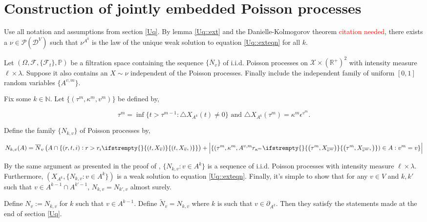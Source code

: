 \documentclass[12pt]{article}
\newcommand{\mb}{\mathbb}
\newcommand{\mc}{\mathcal}
\newcommand{\ov}{\overline}
\newcommand{\te}{\text}
\newcommand{\ep}{\epsilon}
\newcommand{\tr}{\textcolor{red}}
\newcommand{\ind}{\hspace{24pt}}
\newcommand{\pr}{\mb{P}}							%
\newcommand{\defeq}{:=}								%
\newcommand{\pmsr}{\mc{P}}							%
\newcommand{\cad}{\mc{D}}							%
\newcommand{\sta}{\mc{X}}							%
\newcommand{\cl}[1]{\ov{#1}}						%
\newcommand{\bdry}[1]{\partial_{#1}}				%
\newcommand{\indx}[1]{^{#1}}						%
\newcommand{\Xf}{X}									%
\newcommand{\poiss}{N}								%
\newcommand{\leb}{\lambda}							%
\newcommand{\Sm}{\ell}								%
\newcommand{\rate}{r}								%
\newcommand{\F}{\mc{F}}								%
\newcommand{\delt}{\triangle}						%
\newcommand{\poissv}[1]{_{#1}}						%
\newcommand{\vind}[1]{_{#1}}						%
\newcommand{\tme}[1]{(#1)}							%
\newcommand{\vpara}[1]{^{#1}}						%
\newcommand{\stpara}[1]{_{#1}}						%
\newcommand{\tpara}[1]{_{#1}}						%
\newcommand{\tmepro}[3]{
\ifstrempty{#3}{
	\left(#1,#2\right)}{
	\left(#1,#2,#3\right)}}							%
\newcommand{\rv}{A}								%
\newcommand{\alt}[1]{\tilde{#1}}					%
\newcommand{\rt}{\tau}								%
\renewcommand{\mark}{\kappa}						%
\newcommand{\mm}{\nu}								%
\newcommand{\ev}[1]{\ep^{#1}}						%
\begin{document}
\section{Construction of jointly embedded Poisson processes}
\label{con}

Use all notation and assumptions from section \ref{Uq}. By lemma \ref{Uq::ext} and the Danielle-Kolmogorov theorem \tr{citation needed}, there exists a \(\mm \in \pmsr(\cad\vpara{V})\) such that \(\mm\vpara{A\indx{k}}\) is the law of the unique weak solution to equation \eqref{Uq::exteqn} for all \(k\).

\ind Let \((\Omega,\F,\{\F\tpara{t}\},\pr)\) be a filtration space containing the sequence \(\{\ov{\poiss}\poissv{v}\}\) of i.i.d. Poisson processes on \(\sta\times(\mb{R}^+)^2\) with intensity measure \(\Sm\times\leb\). Suppose it also contains an \(\Xf \sim \mm\) independent of the Poisson processes. Finally include the independent family of uniform \([0,1]\) random variables \(\{\rv\vpara{v,m}\}\). 

\ind Fix some \(k \in \mb{N}\). Let \(\{(\rt\indx{m},\mark\indx{m},v\indx{m})\}\) be defined by,

\[\rt\indx{m} = \inf\{t > \rt\indx{m-1}: \delt\Xf\vind{A\indx{k}}\tme{t} \neq 0\} \te{ and } \delt\Xf\vind{A\indx{k}}\tme{\rt\indx{m}} = \mark\indx{m}\ev{v\indx{m}}.\]

Define the family \(\{\poiss\poissv{k,v}\}\) of Poisson processes by,

\begin{equation}
\poiss\poissv{k,v}(A) = \ov{\poiss}\poissv{v}\left(A \cap \{(r,t,i): r > \rate\stpara{i}\tmepro{t}{\Xf\vind{\cl{v}}}{}\}\right) + \left|\{(\rt\indx{m},\mark\indx{m},\rv\vpara{v,m}\rate\stpara{\mark\indx{m}}\tmepro{\rt\indx{m}}{\Xf\vind{\cl{v\indx{m}}}}{}) \in A:v\indx{m} = v\}\right|
\end{equation}

By the same argument as presented in the proof of \cite[proposition 14.7.I]{DalVer08}, \(\{\poiss\poissv{k,v}:v \in A\indx{k}\}\) is a sequence of i.i.d. Poisson processes with intensity measure \(\Sm\times\leb\). Furthermore, \((\Xf\vind{A\indx{k}},\{\poiss\poissv{k,v}:v \in A\indx{k}\})\) is a weak solution to equation \eqref{Uq::exteqn}. Finally, it's simple to show that for any \(v \in V\) and \(k,k'\) such that \(v \in A\indx{k-1}\cap A\indx{k'-1}\), \(\poiss\poissv{k,v} = \poiss\poissv{k',v}\) almost surely.

\ind Define \(\poiss\poissv{v} \defeq \poiss\poissv{k,v}\) for \(k\) such that \(v \in A\indx{k-1}\). Define \(\alt{\poiss}\poissv{v} = \poiss\poissv{k,v}\) where \(k\) is such that \(v \in \bdry{A\indx{k}}\). Then they satisfy the statements made at the end of section \ref{Uq}.
\end{document}
